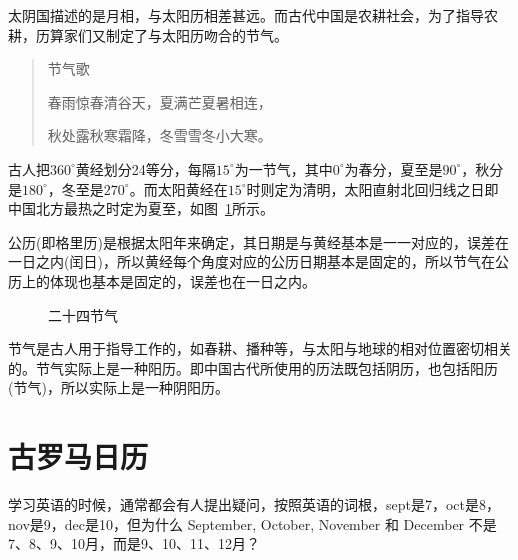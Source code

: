 太阴国描述的是月相，与太阳历相差甚远。而古代中国是农耕社会，为了指导农耕，历算家们又制定了与太阳历吻合的节气。

\begin{quotation}
节气歌

春雨惊春清谷天，夏满芒夏暑相连，

秋处露秋寒霜降，冬雪雪冬小大寒。
\end{quotation}

古人把$360^\circ$黄经划分24等分，每隔$15^\circ$为一节气，其中$0^\circ$为春分，夏至是$90^\circ$，秋分是$180^\circ$，冬至是$270^\circ$。而太阳黄经在$15^\circ$时则定为清明，太阳直射北回归线之日即中国北方最热之时定为夏至，如图~\ref{fig:24-jie-qi}所示。

公历(即格里历)是根据太阳年来确定，其日期是与黄经基本是一一对应的，误差在一日之内(闰日)，所以黄经每个角度对应的公历日期基本是固定的，所以节气在公历上的体现也基本是固定的，误差也在一日之内。

\begin{figure}[htbp]
  \centering
  \caption{二十四节气}
  \label{fig:24-jie-qi}
\end{figure}

节气是古人用于指导工作的，如春耕、播种等，与太阳与地球的相对位置密切相关的。节气实际上是一种阳历。即中国古代所使用的历法既包括阴历，也包括阳历(节气)，所以实际上是一种阴阳历。



\section{古罗马日历}
\label{sec:Rome-calender}

学习英语的时候，通常都会有人提出疑问，按照英语的词根，sept是7，oct是8，
nov是9，dec是10，但为什么 September, October, November 和 December 不是
7、8、9、10月，而是9、10、11、12月？

